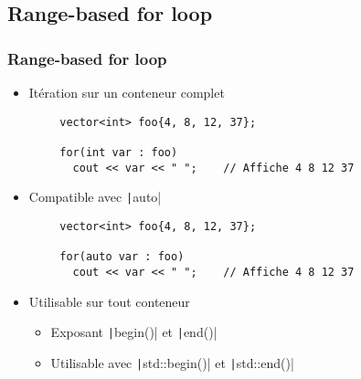 \documentclass[C++.tex]{subfiles}
\begin{document}
\subsection*{Range-based for loop}
\begin{frame}[fragile]
	\frametitle{Range-based for loop}
	\begin{itemize}
		\item Itération sur un conteneur complet
	\end{itemize}

	\begin{verbatim}
		vector<int> foo{4, 8, 12, 37};

		for(int var : foo)
		  cout << var << " ";    // Affiche 4 8 12 37
	\end{verbatim}

	\begin{itemize}
		\item Compatible avec \texttt|auto|
	\end{itemize}

	\begin{verbatim}
		vector<int> foo{4, 8, 12, 37};

		for(auto var : foo)
		  cout << var << " ";    // Affiche 4 8 12 37
	\end{verbatim}

	\begin{itemize}
		\item Utilisable sur tout conteneur
		\begin{itemize}
			\item Exposant \texttt|begin()| et \texttt|end()|
			\item Utilisable avec \texttt|std::begin()| et \texttt|std::end()|
		\end{itemize}
	\end{itemize}
\end{frame}
\end{document}

